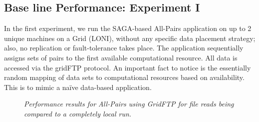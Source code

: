 \documentclass{rspublic}
\begin{document}
\subsection{Base line Performance: Experiment I} In the first
experiment, we run the SAGA-based All-Pairs application on up to 2
unique machines on a Grid (LONI), without any specific data placement
strategy; also, no replication or fault-tolerance takes place.  The
application sequentially assigns sets of pairs to the first available
computational resource.  All data is accessed via the gridFTP protocol.
An important fact to notice is the essentially random mapping of data
sets to computational resources based on availability.  This is to mimic
a naïve data-based application.
\begin{center}
\begin{figure}
\caption{\textit{Performance results for All-Pairs using GridFTP for
file reads being compared to a completely local run.}}
\label{expirement}
\end{figure}
\end{center}
\end{document}
